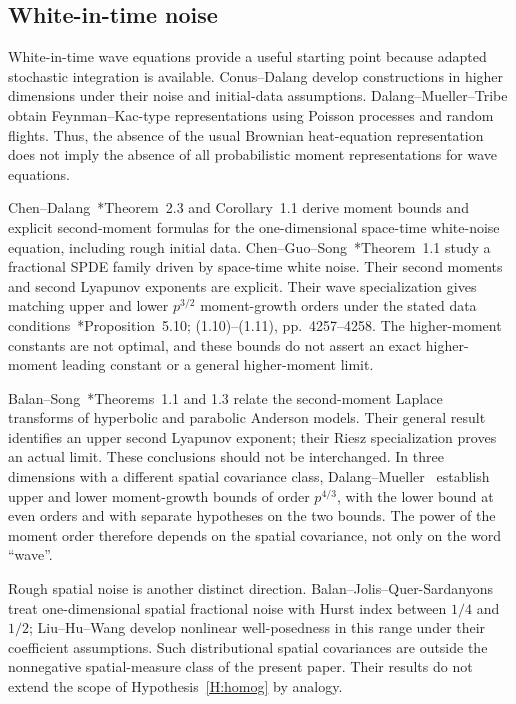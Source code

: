 

\subsection{White-in-time noise}

White-in-time wave equations provide a useful starting point because adapted
stochastic integration is available. Conus--Dalang
\cite{conus.dalang:08:non-linear} develop constructions in higher dimensions
under their noise and initial-data assumptions. Dalang--Mueller--Tribe
\cite{dalang.mueller.ea:08:feynman-kac-type} obtain Feynman--Kac-type
representations using Poisson processes and random flights. Thus, the absence
of the usual Brownian heat-equation representation does not imply the absence
of all probabilistic moment representations for wave equations.

Chen--Dalang~\cite{chen.dalang:15:moment}*{Theorem~2.3 and Corollary~1.1}
derive moment bounds and explicit second-moment formulas for the
one-dimensional space-time white-noise equation, including rough initial
data. Chen--Guo--Song~\cite{chen.guo.ea:24:moments}*{Theorem~1.1} study a
fractional SPDE family driven by space-time white noise. Their second moments
and second Lyapunov exponents are explicit. Their wave specialization gives
matching upper and lower $p^{3/2}$ moment-growth orders under the stated data
conditions~\cite{chen.guo.ea:24:moments}*{Proposition~5.10; (1.10)--(1.11),
pp.~4257--4258}. The higher-moment constants are not optimal, and these bounds
do not assert an exact higher-moment leading constant or a general
higher-moment limit.

Balan--Song~\cite{balan.song:19:second}*{Theorems~1.1 and 1.3} relate the
second-moment Laplace transforms of hyperbolic and parabolic Anderson models.
Their general result identifies an upper second Lyapunov exponent; their
Riesz specialization proves an actual limit. These conclusions should not be
interchanged. In three dimensions with a different spatial covariance class,
Dalang--Mueller~\cite{dalang.mueller:09:intermittency} establish upper and
lower moment-growth bounds of order $p^{4/3}$, with the lower bound at even
orders and with separate hypotheses on the two bounds. The power of the moment
order therefore depends on the spatial covariance, not only on the word
``wave''.

Rough spatial noise is another distinct direction. Balan--Jolis--Quer-Sardanyons
\cite{balan.jolis.ea:17:intermittency} treat one-dimensional spatial fractional
noise with Hurst index between $1/4$ and $1/2$; Liu--Hu--Wang
\cite{liu.hu.ea:22:nonlinear} develop nonlinear well-posedness in this range
under their coefficient assumptions. Such distributional spatial covariances
are outside the nonnegative spatial-measure class of the present paper. Their
results do not extend the scope of Hypothesis~\ref{H:homog} by analogy.

